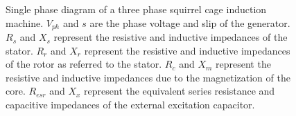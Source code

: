 \begin{figure}
	
\centering
\caption{Single phase diagram of a three phase squirrel cage induction machine. $V_{ph}$ and $s$ are the phase voltage and slip of the generator. $R_s$ and $X_s$ represent the resistive and inductive impedances of the stator. $R_r$ and $X_r$ represent the resistive and inductive impedances of the rotor as referred to the stator. $R_c$ and $X_m$ represent the resistive and inductive impedances due to the magnetization of the core. $R_{esr}$ and $X_x$ represent the equivalent series resistance and capacitive impedances of the external excitation capacitor.}
\label{fig:SCIG__circuit_diagram}



\end{figure}